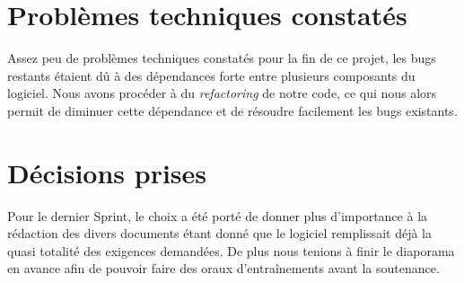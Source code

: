 \documentclass[12pt,a4paper,openany]{article}
\begin{document}
	
	\section{Problèmes techniques constatés}
	Assez peu de problèmes techniques constatés pour la fin de ce projet, les bugs restants étaient dû à des dépendances forte entre plusieurs composants du logiciel. Nous avons procéder à du \textit{refactoring} de notre code, ce qui nous alors permit de diminuer cette dépendance et de résoudre facilement les bugs existants. 

	\section{Décisions prises}
	Pour le dernier Sprint, le choix a été porté de donner plus d'importance à la rédaction des divers documents étant donné que le logiciel remplissait déjà la quasi totalité des exigences demandées.
	De plus nous tenions à finir le diaporama en avance afin de pouvoir faire des oraux d’entraînements avant la soutenance. 

	
\end{document}
